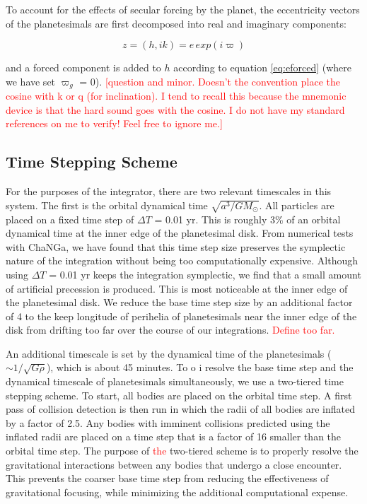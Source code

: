 \documentclass[twocolumn]{aastex63}
\newcommand{\ACBc}[1]{\textcolor{red}{#1}}
\begin{document}
To account for the effects of secular forcing by the planet, the eccentricity vectors of the planetesimals are first decomposed into real and imaginary 
components:

\begin{equation}\label{eq:hk}
	z = (h, ik) = e \, exp(i \varpi)
\end{equation}

\noindent and a forced component is added to $h$ according to equation \ref{eq:eforced} (where we have set $\varpi_{g}$ = 0). \ACBc{[question and minor.  Doesn't the convention place the cosine with k or q (for inclination).  I tend to recall this because the mnemonic device is that the hard sound goes with the cosine. I do not have my standard references on me to verify!  Feel free to ignore me.]}

\subsection{Time Stepping Scheme}\label{sec:timestep}

For the purposes of the integrator, there are two relevant timescales in this system. The first is the orbital dynamical time $\sqrt{a^3/
G M_{\odot}}$. All particles are placed on a fixed time step of $\Delta T$ = 0.01 yr. This is roughly 3\% of an orbital dynamical time at 
the inner edge of the planetesimal disk. From numerical tests with {\sc ChaNGa}, we have found that this time step size preserves 
the symplectic nature of the integration without being too computationally expensive. Although using $\Delta T$ = 0.01 yr keeps the 
integration symplectic, we find that a small amount of artificial precession is produced. This is most noticeable at the inner edge of the
planetesimal disk. We reduce the base time step size by an additional 
factor of 4 to the keep longitude of perihelia of planetesimals near the inner edge of the disk from drifting too far over the course of our 
integrations. \ACBc{Define too far.}

An additional timescale is set by the dynamical time of the planetesimals ($\sim 1/\sqrt{G \rho}$), which is about 45 minutes. To o i
resolve the base time step and the dynamical timescale of planetesimals simultaneously, we use a two-tiered time stepping scheme. 
To start, all bodies are placed on the orbital time step. A first pass of collision detection is then run in 
which the radii of all bodies are inflated by a factor of 2.5. Any bodies with imminent collisions predicted using the inflated radii are 
placed on a time step that is a factor of 16 smaller than the orbital time step. The purpose of \ACBc{the} two-tiered scheme is to properly resolve 
the gravitational interactions between any bodies that undergo a close encounter. This prevents the coarser base time step from 
reducing the effectiveness of gravitational focusing, while minimizing the additional computational expense.
\end{document}
